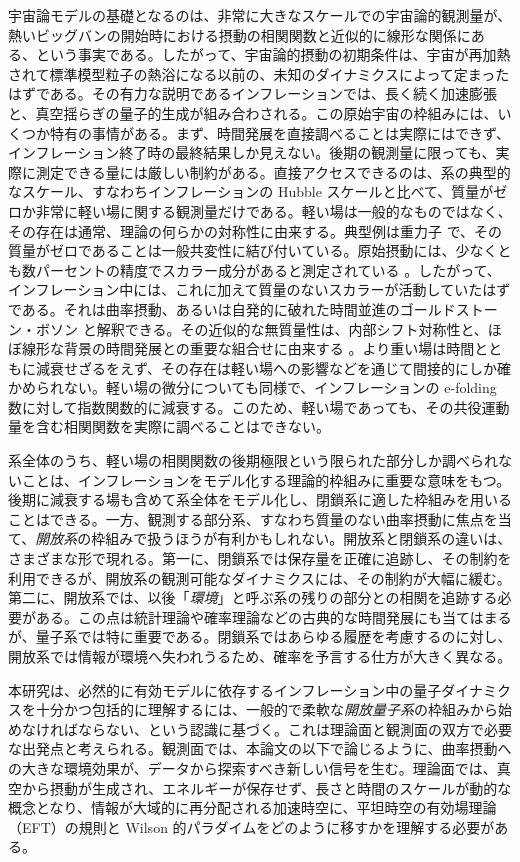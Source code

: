 \documentclass[a4paper,11pt]{ltjsarticle}
\numberwithin{equation}{section}
\begin{document}
宇宙論モデルの基礎となるのは、非常に大きなスケールでの宇宙論的観測量が、熱いビッグバンの開始時における摂動の相関関数と近似的に線形な関係にある、という事実である。したがって、宇宙論的摂動の初期条件は、宇宙が再加熱されて標準模型粒子の熱浴になる以前の、未知のダイナミクスによって定まったはずである。その有力な説明であるインフレーションでは、長く続く加速膨張と、真空揺らぎの量子的生成が組み合わされる。この原始宇宙の枠組みには、いくつか特有の事情がある。まず、時間発展を直接調べることは実際にはできず、インフレーション終了時の最終結果しか見えない。後期の観測量に限っても、実際に測定できる量には厳しい制約がある。直接アクセスできるのは、系の典型的なスケール、すなわちインフレーションの Hubble スケールと比べて、質量がゼロか非常に軽い場に関する観測量だけである。軽い場は一般的なものではなく、その存在は通常、理論の何らかの対称性に由来する。典型例は重力子 \cite{Starobinsky:1979ty} で、その質量がゼロであることは一般共変性に結び付いている。原始摂動には、少なくとも数パーセントの精度でスカラー成分があると測定されている \cite{BICEPKeck:2022mhb}。したがって、インフレーション中には、これに加えて質量のないスカラーが活動していたはずである。それは曲率摂動、あるいは自発的に破れた時間並進のゴールドストーン・ボソン \cite{Cheung:2007st} と解釈できる。その近似的な無質量性は、内部シフト対称性と、ほぼ線形な背景の時間発展との重要な組合せに由来する \cite{Finelli:2018upr}。より重い場は時間とともに減衰せざるをえず、その存在は軽い場への影響などを通じて間接的にしか確かめられない。軽い場の微分についても同様で、インフレーションの e-folding 数に対して指数関数的に減衰する。このため、軽い場であっても、その共役運動量を含む相関関数を実際に調べることはできない。

系全体のうち、軽い場の相関関数の後期極限という限られた部分しか調べられないことは、インフレーションをモデル化する理論的枠組みに重要な意味をもつ。後期に減衰する場も含めて系全体をモデル化し、閉鎖系に適した枠組みを用いることはできる。一方、観測する部分系、すなわち質量のない曲率摂動に焦点を当て、\textit{開放系}の枠組みで扱うほうが有利かもしれない。開放系と閉鎖系の違いは、さまざまな形で現れる。第一に、閉鎖系では保存量を正確に追跡し、その制約を利用できるが、開放系の観測可能なダイナミクスには、その制約が大幅に緩む。第二に、開放系では、以後「\textit{環境}」と呼ぶ系の残りの部分との相関を追跡する必要がある。この点は統計理論や確率理論などの古典的な時間発展にも当てはまるが、量子系では特に重要である。閉鎖系ではあらゆる履歴を考慮するのに対し、開放系では情報が環境へ失われうるため、確率を予言する仕方が大きく異なる。

本研究は、必然的に有効モデルに依存するインフレーション中の量子ダイナミクスを十分かつ包括的に理解するには、一般的で柔軟な\textit{開放量子系}の枠組みから始めなければならない、という認識に基づく。これは理論面と観測面の双方で必要な出発点と考えられる。観測面では、本論文の以下で論じるように、曲率摂動への大きな環境効果が、データから探索すべき新しい信号を生む。理論面では、真空から摂動が生成され、エネルギーが保存せず、長さと時間のスケールが動的な概念となり、情報が大域的に再分配される加速時空に、平坦時空の有効場理論（EFT）の規則と Wilson 的パラダイムをどのように移すかを理解する必要がある。
\end{document}
